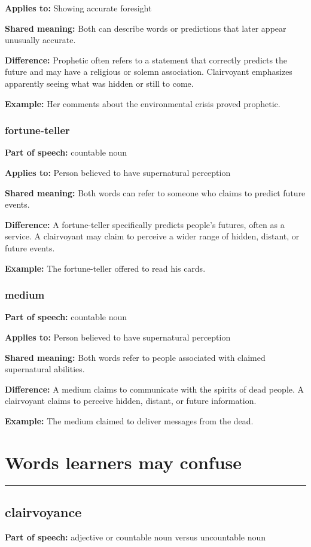\documentclass[11pt]{article}
\newcommand{\sectionrule}{\par\vspace{-0.5em}\noindent\textcolor{Accent}{\rule{\linewidth}{0.6pt}}\par}
\begin{document}
\textbf{Applies to:} Showing accurate foresight

\textbf{Shared meaning:} Both can describe words or predictions that later appear unusually accurate.

\textbf{Difference:} Prophetic often refers to a statement that correctly predicts the future and may have a religious or solemn association. Clairvoyant emphasizes apparently seeing what was hidden or still to come.

\textbf{Example:} Her comments about the environmental crisis proved prophetic.

\subsubsection{fortune-teller}
\textbf{Part of speech:} countable noun

\textbf{Applies to:} Person believed to have supernatural perception

\textbf{Shared meaning:} Both words can refer to someone who claims to predict future events.

\textbf{Difference:} A fortune-teller specifically predicts people's futures, often as a service. A clairvoyant may claim to perceive a wider range of hidden, distant, or future events.

\textbf{Example:} The fortune-teller offered to read his cards.

\subsubsection{medium}
\textbf{Part of speech:} countable noun

\textbf{Applies to:} Person believed to have supernatural perception

\textbf{Shared meaning:} Both words refer to people associated with claimed supernatural abilities.

\textbf{Difference:} A medium claims to communicate with the spirits of dead people. A clairvoyant claims to perceive hidden, distant, or future information.

\textbf{Example:} The medium claimed to deliver messages from the dead.

\section{Words learners may confuse}
\sectionrule
\subsection{clairvoyance}
\textbf{Part of speech:} adjective or countable noun versus uncountable noun
\end{document}
